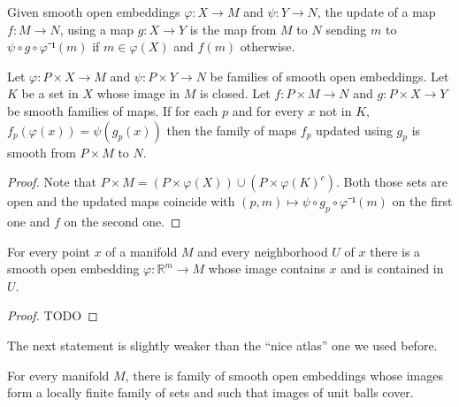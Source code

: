 \begin{definition}
  \label{def:update}
  \leanok
  Given smooth open embeddings $φ : X → M$ and $ψ : Y → N$, the update of a map
  $f : M → N$, using a map $g : X → Y$
  is the map from $M$ to $N$ sending $m$ to $ψ ∘ g ∘ φ⁻¹(m)$ if
  $m ∈ φ(X)$ and $f(m)$ otherwise.
\end{definition}


\begin{lemma}
  \label{lem:smooth_updating}
  \leanok
  Let $φ : P × X → M$ and $ψ : P × Y → N$ be families of smooth open embeddings.
  Let $K$ be a set in $X$ whose image in $M$ is closed. Let $f : P × M → N$
  and $g : P × X → Y$ be
  smooth families of maps. If for each $p$ and for every $x$ not in $K$,
  $f_p(φ(x)) = ψ(g_p(x))$ then the family of maps $f_p$ updated using $g_p$ is
  smooth from $P × M$ to $N$.
\end{lemma}

\begin{proof}
  \leanok
  Note that $P × M = (P × φ(X)) ∪ (P × φ(K)^c)$. Both
  those sets are open and the updated maps coincide with
  $(p, m) ↦ ψ ∘ g_p ∘ φ⁻¹(m)$ on the first one and $f$ on the second one.
\end{proof}

\begin{lemma}
  \label{lem:exists_chart}
  For every point $x$ of a manifold $M$ and every neighborhood $U$ of $x$ there
  is a smooth open embedding $φ : ℝ^m → M$ whose image contains $x$ and is
  contained in $U$.
\end{lemma}

\begin{proof}
  TODO
\end{proof}

The next statement is slightly weaker than the “nice atlas” one we used before.

\begin{lemma}
  \label{lem:exists_atlas}
  \leanok
  For every manifold $M$, there is family of smooth open embeddings whose images
  form a locally finite family of sets and such that images of unit balls
  cover.
\end{lemma}

